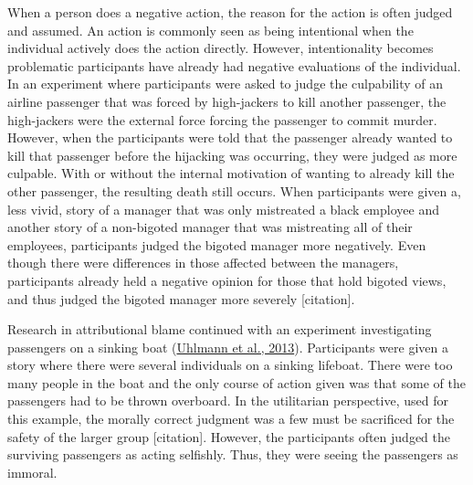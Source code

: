 \documentclass[
  donotrepeattitle,doc, 12pt, a4paper,floatsintext]{apa7}
\begin{document}
When a person does a negative action, the reason for the action is often judged and assumed. An action is commonly seen as being intentional when the individual actively does the action directly. However, intentionality becomes problematic participants have already had negative evaluations of the individual. In an experiment where participants were asked to judge the culpability of an airline passenger that was forced by high-jackers to kill another passenger, the high-jackers were the external force forcing the passenger to commit murder. However, when the participants were told that the passenger already wanted to kill that passenger before the hijacking was occurring, they were judged as more culpable. With or without the internal motivation of wanting to already kill the other passenger, the resulting death still occurs. When participants were given a, less vivid, story of a manager that was only mistreated a black employee and another story of a non-bigoted manager that was mistreating all of their employees, participants judged the bigoted manager more negatively. Even though there were differences in those affected between the managers, participants already held a negative opinion for those that hold bigoted views, and thus judged the bigoted manager more severely {[}citation{]}.

Research in attributional blame continued with an experiment investigating passengers on a sinking boat (\protect\hyperlink{ref-uhlmann2013}{Uhlmann et al., 2013}). Participants were given a story where there were several individuals on a sinking lifeboat. There were too many people in the boat and the only course of action given was that some of the passengers had to be thrown overboard. In the utilitarian perspective, used for this example, the morally correct judgment was a few must be sacrificed for the safety of the larger group {[}citation{]}. However, the participants often judged the surviving passengers as acting selfishly. Thus, they were seeing the passengers as immoral.
\end{document}
